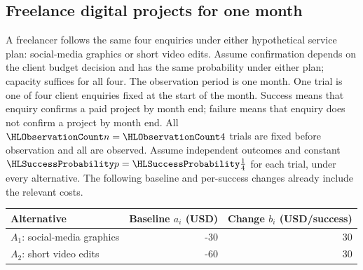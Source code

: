 \subsection{Freelance digital projects for one month}\label{prob:c4-energy}
A freelancer follows the same four enquiries under either hypothetical service plan: social-media graphics or short video edits. Assume confirmation depends on the client budget decision and has the same probability under either plan; capacity suffices for all four.
The observation period is one month. One trial is one of four client enquiries fixed at the start of the month.
Success means that enquiry confirms a paid project by month end; failure means that enquiry does not confirm a project by month end.
All $\TrialCount{n}=\TrialCount{4}$ trials are fixed before observation and all are observed.
Assume independent outcomes and constant $\SuccessProb{p}=\SuccessProb{\frac{1}{4}}$ for each trial, under every alternative.
The following baseline and per-success changes already include the relevant costs.
\begin{center}\begin{tabular}{lrr}\toprule Alternative & Baseline $a_i$ (USD) & Change $b_i$ (USD/success)\\\midrule
$A_1$: social-media graphics & -30 & 30\\
$A_2$: short video edits & -60 & 30\\
\bottomrule\end{tabular}\end{center}
